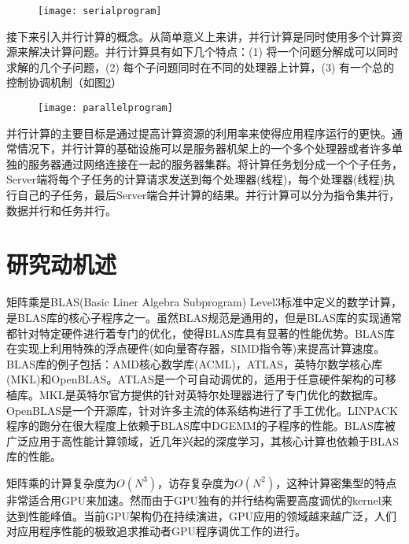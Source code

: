 \begin{figure}[!htbp]
	\centering
	\texttt{[image: serialprogram]}
	\label{fig:serialprogram}
\end{figure}

接下来引入并行计算的概念。从简单意义上来讲，并行计算是同时使用多个计算资源来解决计算问题。并行计算具有如下几个特点：(1) 将一个问题分解成可以同时求解的几个子问题，(2) 每个子问题同时在不同的处理器上计算，(3) 有一个总的控制协调机制（如图\ref{fig:parallelprogram}）

\begin{figure}[!htbp]
	\centering
	\texttt{[image: parallelprogram]}
	\label{fig:parallelprogram}
\end{figure}

并行计算的主要目标是通过提高计算资源的利用率来使得应用程序运行的更快。通常情况下，并行计算的基础设施可以是服务器机架上的一个多个处理器或者许多单独的服务器通过网络连接在一起的服务器集群。将计算任务划分成一个个子任务，Server端将每个子任务的计算请求发送到每个处理器(线程)，每个处理器(线程)执行自己的子任务，最后Server端合并计算的结果。并行计算可以分为指令集并行，数据并行和任务并行。


\section{研究动机述}
矩阵乘是BLAS(Basic Liner Algebra Subprogram) Level3标准中定义的数学计算，是BLAS库的核心子程序之一。虽然BLAS规范是通用的，但是BLAS库的实现通常都针对特定硬件进行着专门的优化，使得BLAS库具有显著的性能优势。BLAS库在实现上利用特殊的浮点硬件(如向量寄存器，SIMD指令等)来提高计算速度。BLAS库的例子包括：AMD核心数学库(ACML)，ATLAS，英特尔数学核心库(MKL)和OpenBLAS。ATLAS是一个可自动调优的，适用于任意硬件架构的可移植库。MKL是英特尔官方提供的针对英特尔处理器进行了专门优化的数据库。OpenBLAS是一个开源库，针对许多主流的体系结构进行了手工优化。LINPACK程序的跑分在很大程度上依赖于BLAS库中DGEMM的子程序的性能。BLAS库被广泛应用于高性能计算领域，近几年兴起的深度学习，其核心计算也依赖于BLAS库的性能。

矩阵乘的计算复杂度为$O(N^3)$，访存复杂度为$O(N^2)$，这种计算密集型的特点非常适合用GPU来加速。然而由于GPU独有的并行结构需要高度调优的kernel来达到性能峰值。当前GPU架构仍在持续演进，GPU应用的领域越来越广泛，人们对应用程序性能的极致追求推动者GPU程序调优工作的进行。


